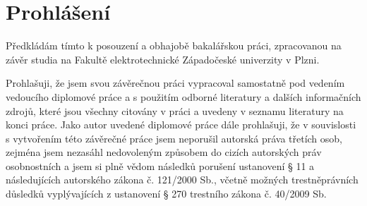\chapter*{Prohlášení}
Předkládám tímto k posouzení a obhajobě bakalářskou práci, zpracovanou na závěr studia na Fakultě elektrotechnické Západočeské univerzity v Plzni.

Prohlašuji, že jsem svou závěrečnou práci vypracoval samostatně pod vedením vedoucího diplomové práce a s použitím odborné literatury a dalších informačních zdrojů, které jsou všechny citovány v práci a uvedeny v seznamu literatury na konci práce. Jako autor uvedené diplomové práce dále prohlašuji, že v souvislosti s vytvořením této závěrečné práce jsem neporušil autorská práva třetích osob, zejména jsem nezasáhl nedovoleným způsobem do cizích autorských práv osobnostních a jsem si plně vědom následků po\-ru\-še\-ní ustanovení § 11 a následujících autorského zákona č. 121/2000 Sb., včetně možných trestněprávních důsledků vyplývajících z ustanovení § 270 trestního zákona č. 40/2009 Sb.